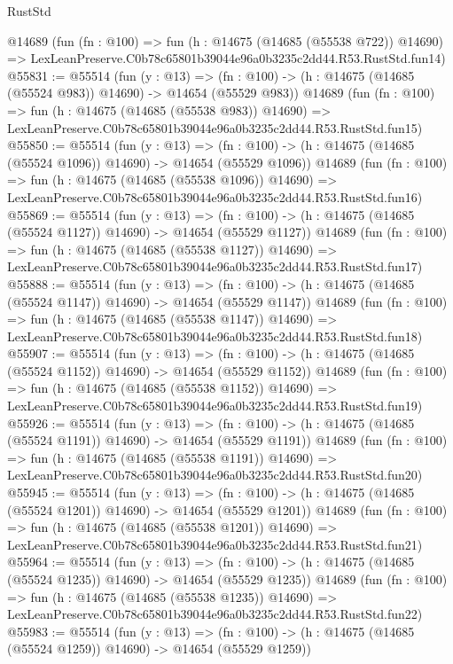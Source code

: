 \begin{lexlean}{RustStd}
\begin{coremodule}
    @14689
    (fun (fn : @100) =>
    fun (h : @14675 (@14685 (@55538 @722)) @14690) =>
    LexLeanPreserve.C0b78c65801b39044e96a0b3235c2dd44.R53.RustStd.fun14)
@55831 := @55514
    (fun (y : @13) =>
    (fn : @100) -> (h : @14675 (@14685 (@55524 @983)) @14690) -> @14654 (@55529 @983))
    @14689
    (fun (fn : @100) =>
    fun (h : @14675 (@14685 (@55538 @983)) @14690) =>
    LexLeanPreserve.C0b78c65801b39044e96a0b3235c2dd44.R53.RustStd.fun15)
@55850 := @55514
    (fun (y : @13) =>
    (fn : @100) -> (h : @14675 (@14685 (@55524 @1096)) @14690) -> @14654 (@55529 @1096))
    @14689
    (fun (fn : @100) =>
    fun (h : @14675 (@14685 (@55538 @1096)) @14690) =>
    LexLeanPreserve.C0b78c65801b39044e96a0b3235c2dd44.R53.RustStd.fun16)
@55869 := @55514
    (fun (y : @13) =>
    (fn : @100) -> (h : @14675 (@14685 (@55524 @1127)) @14690) -> @14654 (@55529 @1127))
    @14689
    (fun (fn : @100) =>
    fun (h : @14675 (@14685 (@55538 @1127)) @14690) =>
    LexLeanPreserve.C0b78c65801b39044e96a0b3235c2dd44.R53.RustStd.fun17)
@55888 := @55514
    (fun (y : @13) =>
    (fn : @100) -> (h : @14675 (@14685 (@55524 @1147)) @14690) -> @14654 (@55529 @1147))
    @14689
    (fun (fn : @100) =>
    fun (h : @14675 (@14685 (@55538 @1147)) @14690) =>
    LexLeanPreserve.C0b78c65801b39044e96a0b3235c2dd44.R53.RustStd.fun18)
@55907 := @55514
    (fun (y : @13) =>
    (fn : @100) -> (h : @14675 (@14685 (@55524 @1152)) @14690) -> @14654 (@55529 @1152))
    @14689
    (fun (fn : @100) =>
    fun (h : @14675 (@14685 (@55538 @1152)) @14690) =>
    LexLeanPreserve.C0b78c65801b39044e96a0b3235c2dd44.R53.RustStd.fun19)
@55926 := @55514
    (fun (y : @13) =>
    (fn : @100) -> (h : @14675 (@14685 (@55524 @1191)) @14690) -> @14654 (@55529 @1191))
    @14689
    (fun (fn : @100) =>
    fun (h : @14675 (@14685 (@55538 @1191)) @14690) =>
    LexLeanPreserve.C0b78c65801b39044e96a0b3235c2dd44.R53.RustStd.fun20)
@55945 := @55514
    (fun (y : @13) =>
    (fn : @100) -> (h : @14675 (@14685 (@55524 @1201)) @14690) -> @14654 (@55529 @1201))
    @14689
    (fun (fn : @100) =>
    fun (h : @14675 (@14685 (@55538 @1201)) @14690) =>
    LexLeanPreserve.C0b78c65801b39044e96a0b3235c2dd44.R53.RustStd.fun21)
@55964 := @55514
    (fun (y : @13) =>
    (fn : @100) -> (h : @14675 (@14685 (@55524 @1235)) @14690) -> @14654 (@55529 @1235))
    @14689
    (fun (fn : @100) =>
    fun (h : @14675 (@14685 (@55538 @1235)) @14690) =>
    LexLeanPreserve.C0b78c65801b39044e96a0b3235c2dd44.R53.RustStd.fun22)
@55983 := @55514
    (fun (y : @13) =>
    (fn : @100) -> (h : @14675 (@14685 (@55524 @1259)) @14690) -> @14654 (@55529 @1259))

\end{coremodule}
\end{lexlean}
